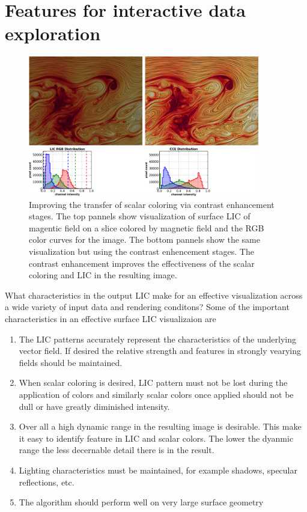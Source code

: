 \documentclass[a4paper,10pt]{article}
\begin{document}
\FloatBarrier

\section{Features for interactive data exploration}
\begin{figure}[ht!]
 \centering
 \includegraphics[width=0.9\textwidth]{./images-data/dia-serial/color-ce-curves-khB-both-h.png}
 \caption{Improving the transfer of scalar coloring via contrast enhancement stages. The top pannels show visualization of surface LIC of magentic field on a slice colored by magnetic field and the RGB color curves for the image. The bottom pannels show the same visualization but using the contrast enhencement stages. The contrast enhancement improves the effectiveness of the scalar coloring and LIC in the resulting image.}
 \label{fig:cce-khb}
\end{figure}
What characteristics in the output LIC make for an effective visualization across a wide variety of input data and rendering conditons? Some of the important characteristics in an effective surface LIC visualizaion are
\begin{enumerate}
 \item The LIC patterns accurately represent the characteristics of the underlying vector field. If desired the relative strength and features in strongly vearying fields should be maintained.
 \item When scalar coloring is desired, LIC pattern must not be lost during the application of colors and similarly scalar colors once applied should not be dull or have greatly diminished intensity.
 \item Over all a high dynamic range in the resulting image is desirable. This make it easy to identify feature in LIC and scalar colors. The lower the dyanmic range the less decernable detail there is in the result.
 \item Lighting characteristics must be maintained, for example shadows, specular reflections, etc.
 \item The algorithm should perform well on very large surface geometry
\end{enumerate}
\end{document}
